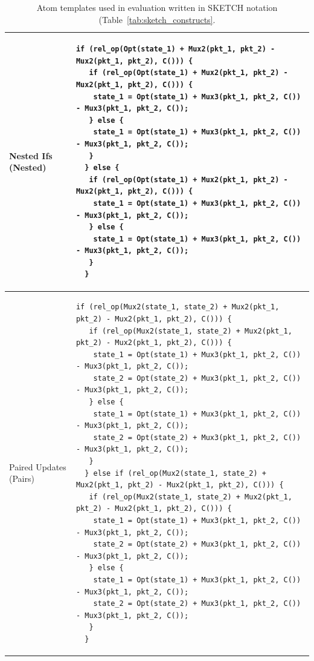 \begin{table}[!t]
\begin{scriptsize}
\begin{tabular}{|p{}|p{}|}
  \hline
  Nested Ifs (Nested) &
  {\begin{lstlisting}[style=customctable]
  if (rel_op(Opt(state_1) + Mux2(pkt_1, pkt_2) - Mux2(pkt_1, pkt_2), C())) {
   if (rel_op(Opt(state_1) + Mux2(pkt_1, pkt_2) - Mux2(pkt_1, pkt_2), C())) {
    state_1 = Opt(state_1) + Mux3(pkt_1, pkt_2, C()) - Mux3(pkt_1, pkt_2, C());
   } else {
    state_1 = Opt(state_1) + Mux3(pkt_1, pkt_2, C()) - Mux3(pkt_1, pkt_2, C());
   }
  } else {
   if (rel_op(Opt(state_1) + Mux2(pkt_1, pkt_2) - Mux2(pkt_1, pkt_2), C())) {
    state_1 = Opt(state_1) + Mux3(pkt_1, pkt_2, C()) - Mux3(pkt_1, pkt_2, C());
   } else {
    state_1 = Opt(state_1) + Mux3(pkt_1, pkt_2, C()) - Mux3(pkt_1, pkt_2, C());
   }
  }
  \end{lstlisting}}\\
  \hline
  Paired Updates (Pairs) &
  {\begin{lstlisting}[style=customctable]
  if (rel_op(Mux2(state_1, state_2) + Mux2(pkt_1, pkt_2) - Mux2(pkt_1, pkt_2), C())) {
   if (rel_op(Mux2(state_1, state_2) + Mux2(pkt_1, pkt_2) - Mux2(pkt_1, pkt_2), C())) {
    state_1 = Opt(state_1) + Mux3(pkt_1, pkt_2, C()) - Mux3(pkt_1, pkt_2, C());
    state_2 = Opt(state_2) + Mux3(pkt_1, pkt_2, C()) - Mux3(pkt_1, pkt_2, C());
   } else {
    state_1 = Opt(state_1) + Mux3(pkt_1, pkt_2, C()) - Mux3(pkt_1, pkt_2, C());
    state_2 = Opt(state_2) + Mux3(pkt_1, pkt_2, C()) - Mux3(pkt_1, pkt_2, C());
   }
  } else if (rel_op(Mux2(state_1, state_2) + Mux2(pkt_1, pkt_2) - Mux2(pkt_1, pkt_2), C())) {
   if (rel_op(Mux2(state_1, state_2) + Mux2(pkt_1, pkt_2) - Mux2(pkt_1, pkt_2), C())) {
    state_1 = Opt(state_1) + Mux3(pkt_1, pkt_2, C()) - Mux3(pkt_1, pkt_2, C());
    state_2 = Opt(state_2) + Mux3(pkt_1, pkt_2, C()) - Mux3(pkt_1, pkt_2, C());
   } else {
    state_1 = Opt(state_1) + Mux3(pkt_1, pkt_2, C()) - Mux3(pkt_1, pkt_2, C());
    state_2 = Opt(state_2) + Mux3(pkt_1, pkt_2, C()) - Mux3(pkt_1, pkt_2, C());
   }
  }
  \end{lstlisting}} \\
  \hline
  \end{tabular}
\end{scriptsize}
\caption{Atom templates used in evaluation written in SKETCH notation (Table~\ref{tab:sketch_constructs}.}
  \label{tab:templates}
\end{table}

